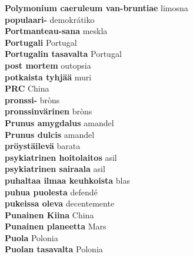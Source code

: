 \textbf{ Polymonium caeruleum van-bruntiae  } limosna \\
\textbf{ populaari-  } demokrátiko \\
\textbf{ Portmanteau-sana  } meskla \\
\textbf{ Portugali  } Portugal \\
\textbf{ Portugalin tasavalta  } Portugal \\
\textbf{ post mortem  } outopsia \\
\textbf{ potkaista tyhjää  } muri \\
\textbf{ PRC  } China \\
\textbf{ pronssi-  } bròns \\
\textbf{ pronssinvärinen  } bròns \\
\textbf{ Prunus amygdalus  } amandel \\
\textbf{ Prunus dulcis  } amandel \\
\textbf{ pröystäilevä  } barata \\
\textbf{ psykiatrinen hoitolaitos  } asil \\
\textbf{ psykiatrinen sairaala  } asil \\
\textbf{ puhaltaa ilmaa keuhkoista  } blas \\
\textbf{ puhua puolesta  } defendé \\
\textbf{ pukeissa oleva  } decentemente \\
\textbf{ Punainen Kiina  } China \\
\textbf{ Punainen planeetta  } Mars \\
\textbf{ Puola  } Polonia \\
\textbf{ Puolan tasavalta  } Polonia \\
